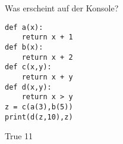 \question[4] Was erscheint auf der Konsole?  
\begin{lstlisting}
def a(x):
    return x + 1
def b(x):
    return x + 2
def c(x,y):
    return x + y
def d(x,y):
    return x > y
z = c(a(3),b(5))
print(d(z,10),z)
\end{lstlisting}
\begin{solutionbox}{1cm}
True 11
\end{solutionbox}
